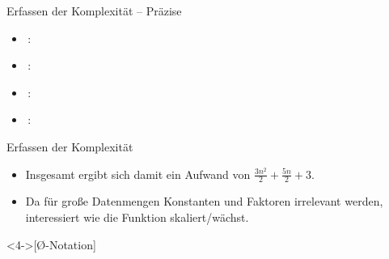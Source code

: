 \begin{frame}[fragile]{Erfassen der Komplexität -- Präzise}
\begin{itemize}[<+(1)->]
\begin{onlyenv}
\end{onlyenv}
    \end{itemize}
\vspace*{-.75\baselineskip}
\begin{multicols}{2}
    \begin{itemize}
        \item<4-> \,: 
        \item<6-> \,: 
        \item<8-> \,: 
        \item<10-> \,: 
    \end{itemize}
\end{multicols}
\end{frame}

\begin{frame}{Erfassen der Komplexität}
    \begin{itemize}[<+(1)->]
        \item Insgesamt ergibt sich damit ein Aufwand von \(\frac{3n^2}{2} + \frac{5n}{2} + 3\).
        \item Da für große Datenmengen Konstanten und Faktoren irrelevant werden, interessiert wie die Funktion skaliert/wächst.
    \end{itemize}
    \begin{definition}<4->[\O-Notation]
         
    \end{definition}
\end{frame}

